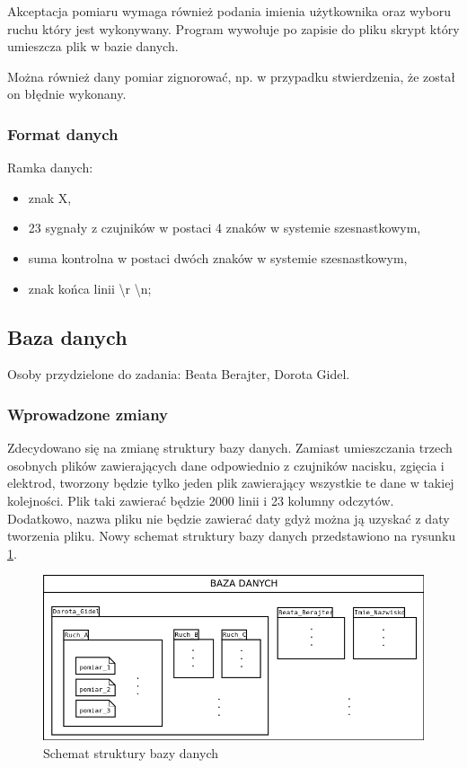 \documentclass{article}
\begin{document}
Akceptacja pomiaru wymaga również podania imienia użytkownika oraz wyboru ruchu który jest wykonywany. Program wywołuje po zapisie do pliku skrypt który umieszcza plik w bazie danych.

Można również dany pomiar zignorować, np. w przypadku stwierdzenia, że został on błędnie wykonany.

\subsubsection{Format danych}
Ramka danych:
\begin{itemize}
    \item znak X,
    \item 23 sygnały z czujników w postaci 4 znaków w systemie szesnastkowym,
    \item suma kontrolna w postaci dwóch znaków w systemie szesnastkowym,
    \item znak końca linii \textbackslash r \textbackslash n;
\end{itemize}

\subsection{Baza danych}
Osoby przydzielone do zadania: Beata Berajter, Dorota Gidel.

\subsubsection{Wprowadzone zmiany}
Zdecydowano się na zmianę struktury bazy danych. Zamiast umieszczania trzech osobnych plików zawierających dane odpowiednio z czujników nacisku, zgięcia i elektrod, tworzony będzie tylko jeden plik zawierający wszystkie te dane w takiej kolejności. Plik taki zawierać będzie 2000 linii i 23 kolumny odczytów. Dodatkowo, nazwa pliku nie będzie zawierać daty gdyż można ją uzyskać z daty tworzenia pliku. Nowy schemat struktury bazy danych przedstawiono na rysunku \ref{rys:baza_danych}.
\begin{figure}[H]
    \centering
    \includegraphics[width=\textwidth]{baza_danych.png}
    \caption{Schemat struktury bazy danych}
    \label{rys:baza_danych}
\end{figure}
\end{document}
